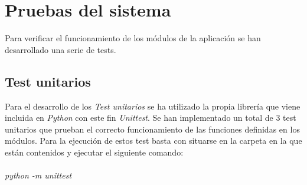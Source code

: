 \section{Pruebas del sistema}
Para verificar el funcionamiento de los módulos de la aplicación se han desarrollado una serie de tests.
\subsection{Test unitarios}
Para el desarrollo de los \emph{Test unitarios} se ha utilizado la propia librería que viene incluida en \emph{Python} con este fin \emph{Unittest}.
Se han implementado un total de 3 test unitarios que prueban el correcto funcionamiento de las funciones definidas en los módulos. Para la ejecución de estos test basta con situarse en la carpeta en la que están contenidos y ejecutar el siguiente comando:\\ \\
\emph{python -m unittest}
